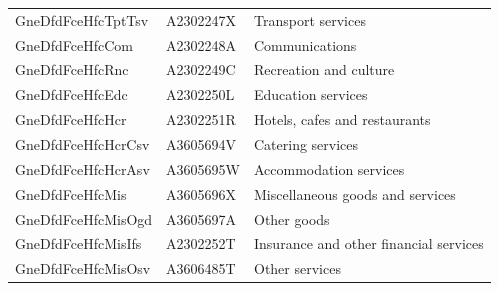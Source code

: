\documentclass[graybox]{svmult}
\begin{document}
\begin{table}[t]
\begin{tabular*}{\columnwidth}[width = \textwidth]{lll}
			\addlinespace
			GneDfdFceHfcTptTsv & A2302247X & Transport services\\
			GneDfdFceHfcCom & A2302248A & Communications\\
			GneDfdFceHfcRnc & A2302249C & Recreation and culture\\
			GneDfdFceHfcEdc & A2302250L & Education services\\
			GneDfdFceHfcHcr & A2302251R & Hotels, cafes and restaurants\\
			\addlinespace
			GneDfdFceHfcHcrCsv & A3605694V & Catering services\\
			GneDfdFceHfcHcrAsv & A3605695W & Accommodation services\\
			GneDfdFceHfcMis & A3605696X & Miscellaneous goods and services\\
			GneDfdFceHfcMisOgd & A3605697A & Other goods\\
			GneDfdFceHfcMisIfs & A2302252T & Insurance and other financial services\\
			GneDfdFceHfcMisOsv & A3606485T & Other services\\
			\bottomrule
		\end{tabular*}
		\label{Tab:Expenditure-hierarchy-3}
	
\end{table}
%
%
%
%
%
\end{document}
